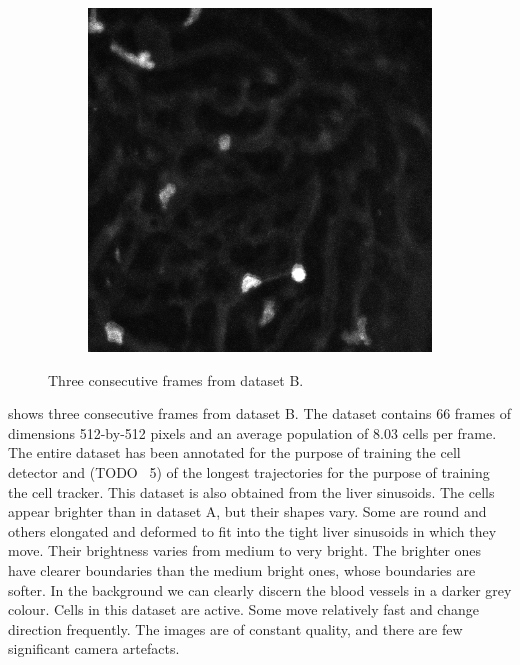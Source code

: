 \begin{figure}[h]
\begin{subfigure}{.32\textwidth}
		\end{subfigure}
		\hfill
		\begin{subfigure}{.32\textwidth}
		\includegraphics[width=\textwidth]{images/series30red025}
		\end{subfigure}
		\caption{Three consecutive frames from dataset B.}
		\label{fig:data_datasetB}
	\end{figure}
		
	 shows three consecutive frames from dataset B. The dataset contains 66 frames of dimensions 512-by-512 pixels and an average population of 8.03 cells per frame. The entire dataset has been annotated for the purpose of training the cell detector and (TODO ~5) of the longest trajectories for the purpose of training the cell tracker. This dataset is also obtained from the liver sinusoids. The cells appear brighter than in dataset A, but their shapes vary. Some are round and others elongated and deformed to fit into the tight liver sinusoids in which they move. Their brightness varies from medium to very bright. The brighter ones have clearer boundaries than the medium bright ones, whose boundaries are softer. In the background we can clearly discern the blood vessels in a darker grey colour. Cells in this dataset are active. Some move relatively fast and change direction frequently. The images are of constant quality, and there are few significant camera artefacts.

